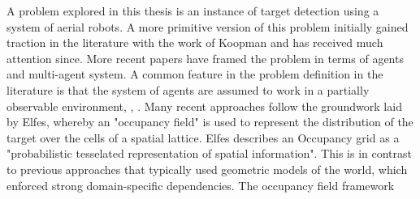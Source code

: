 \workinprogress

A problem explored in this thesis is an instance of target detection using a system of aerial robots. A more primitive version of this problem initially gained traction in the literature with the work of Koopman \cite{KoopmanTheoryOfSearchTargetDetection} and has received much attention since. More recent papers have framed the problem in terms of agents and multi-agent system. %
A common feature in the problem definition in the literature is that the system of agents are assumed to work in a partially observable environment\cite{Symington2010ProbabilisticUAVs}, \cite{Chung2008Multi-agentFramework}, \cite{WongMulti-vehicleTargets}. Many recent approaches follow the groundwork laid by Elfes\cite{ElfesUsingNavigation}, whereby an "occupancy field" is used to represent the distribution of the target over the cells of a spatial lattice. Elfes describes an Occupancy grid as a "probabilistic tesselated representation of spatial information". This is in contrast to previous approaches that typically used geometric models of the world, which enforced strong domain-specific dependencies. The occupancy field framework 
\par